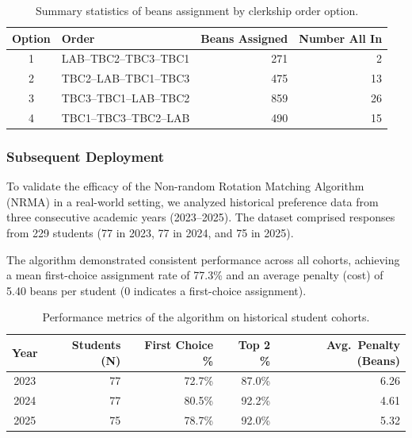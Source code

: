 \documentclass{article}
\begin{document}
\begin{table}[h]
	\centering
	\caption{Summary statistics of beans assignment by clerkship order option.}
	\label{tab:beans-by-option}
	\small
	\begin{tabular}{clrr}
		\toprule
		Option & Order               & Beans Assigned & Number All In \\
		\midrule
		1      & LAB--TBC2--TBC3--TBC1 & 271           & 2             \\
		2      & TBC2--LAB--TBC1--TBC3 & 475           & 13            \\
		3      & TBC3--TBC1--LAB--TBC2 & 859           & 26            \\
		4      & TBC1--TBC3--TBC2--LAB & 490           & 15            \\
		\bottomrule
	\end{tabular}
\end{table}

\subsubsection{Subsequent Deployment}
To validate the efficacy of the Non-random Rotation Matching Algorithm (NRMA) in a real-world setting, we analyzed historical preference data from three consecutive academic years (2023--2025). The dataset comprised responses from 229 students (77 in 2023, 77 in 2024, and 75 in 2025).

The algorithm demonstrated consistent performance across all cohorts, achieving a mean first-choice assignment rate of 77.3\% and an average penalty (cost) of 5.40 beans per student (0 indicates a first-choice assignment).

\begin{table}[h]
	\centering
	\caption{Performance metrics of the algorithm on historical student cohorts.}
	\label{tab:cohort-performance}
	\small
	\begin{tabular}{crrrr}
		\toprule
		Year & Students (N) & First Choice \% & Top 2 \% & Avg.\ Penalty (Beans) \\
		\midrule
		2023 & 77           & 72.7\%         & 87.0\%   & 6.26                 \\
		2024 & 77           & 80.5\%         & 92.2\%   & 4.61                 \\
		2025 & 75           & 78.7\%         & 92.0\%   & 5.32                 \\
		\bottomrule
	\end{tabular}
\end{table}
\end{document}
